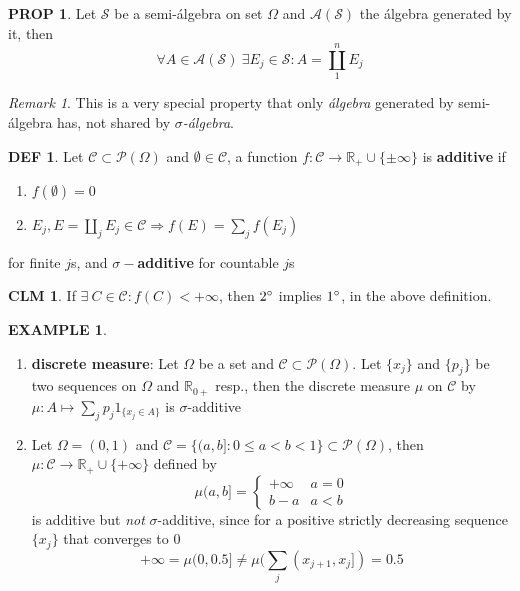 \documentclass[hidelinks]{article}
\theoremstyle{definition}
\newtheorem*{defin}{DEF}
\newtheorem*{eg}{EXAMPLE}
\theoremstyle{dotless}
\newtheorem{proposition}{PROP}[section]
\newtheorem{claim}{CLM}[section]
\theoremstyle{remark}
\newtheorem*{remark}{Remark}
\begin{document}
\begin{proposition}\label{Prop 1.1}
Let $\mathscr{S}$ be a semi-álgebra on set $\Omega$ and $\mathscr{A}(\mathscr{S})$ the álgebra generated by it, then
\[\forall A\in\mathscr{A}(\mathscr{S})\ \exists E_j\in\mathscr{S}:A=\coprod_1^nE_j \]
\end{proposition}

\begin{remark}
This is a very special property that only \emph{álgebra} generated by semi-álgebra has, not shared by \emph{$\sigma$-álgebra}.
\end{remark}

\begin{defin}
Let $\mathscr{C}\subset\mathscr{P}(\Omega)$ and $\emptyset\in\mathscr{C}$, a function $f:\mathscr{C}\to\mathbb{R}_+\cup\{\pm\infty\}$ is \textbf{additive} if
\begin{enumerate}[label=\arabic*\degree]
    \item $f(\emptyset)=0$
    \item $E_j,E=\coprod\limits_jE_j\in\mathscr{C}\Rightarrow f(E)=\sum\limits_jf(E_j)$
\end{enumerate} for finite $j$s, and \textbf{$\sigma-$additive} for countable $j$s
\end{defin}

\begin{claim}
If $\exists\ C\in\mathscr{C}:f(C)<+\infty$, then $2\degree$ implies $1\degree$, in the above definition.
\end{claim}

\begin{eg}~
\begin{enumerate}[label=\arabic*\degree]
    \item \textbf{discrete measure}: Let $\Omega$ be a set and $\mathscr{C}\subset\mathscr{P}(\Omega)$. Let $\{x_j\}$ and $\{p_j\}$ be two sequences on $\Omega$ and $\mathbb{R}_{0+}$ resp., then the discrete measure $\mu$ on $\mathscr{C}$ by $\mu:A\mapsto\sum_jp_j1_{\{x_j\in A\}}$ is $\sigma$-additive
    \item Let $\Omega=(0,1)$ and $\mathscr{C}=\{(a,b]:0\leq a<b<1\}\subset\mathscr{P}(\Omega)$, then $\mu:\mathscr{C}\to\mathbb{R}_+\cup\{+\infty\}$ defined by
    \[\mu(a,b]=
    \begin{cases} 
      +\infty & a=0 \\
      b-a & a<b
   \end{cases}
\]
is additive but \emph{not} $\sigma$-additive, since for a positive strictly decreasing sequence $\{x_j\}$ that converges to 0
\[+\infty=\mu(0,0.5]\neq\mu(\sum_j(x_{j+1},x_j])=0.5\]
\end{enumerate}
\end{eg}
\end{document}
